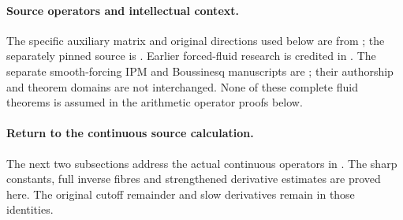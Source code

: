 \documentclass[11pt]{article}
\theoremstyle{definition}\newtheorem{definition}[theorem]{Definition}
\theoremstyle{remark}\newtheorem{remark}[theorem]{Remark}
\begin{document}
\paragraph{Source operators and intellectual context.}
The specific auxiliary matrix and original directions used below are from
\cite[Section 6.1, equations (6.1)--(6.7), and Lemma 6.2]{OpenAINS};
the separately pinned source is \cite{OpenAISource}. Earlier forced-fluid
research is credited in \cite{BuckmasterStatement,CMZEuler,CMZIPM,CMZHypo}.
The separate smooth-forcing IPM and Boussinesq manuscripts are
\cite{ABCIPM,ABBoussinesq}; their authorship and theorem domains are not
interchanged. None of these complete fluid theorems is assumed in the
arithmetic operator proofs below.



\paragraph{Return to the continuous source calculation.}
The next two subsections address the actual continuous operators in
\cite[Lemma 6.2, (6.17)--(6.20), (8.4)--(8.10), (8.14), and
Lemma 8.6, (8.19)--(8.23)]{OpenAINS}. The sharp constants, full inverse
fibres and strengthened derivative estimates are proved here. The original
cutoff remainder and slow derivatives remain in those identities.




\end{document}
